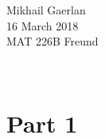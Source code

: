 \documentclass[11pt]{article}
\theoremstyle{definition}
\theoremstyle{remark}
\newcommand{\newquestion}{\hrulefill\vspace{-0.8\baselineskip}\\\null\hrulefill\vspace{-1.0\baselineskip}}
\theoremstyle{plain}
\begin{document}
  \begin{flushright}
    Mikhail Gaerlan\\
    16 March 2018\\
    MAT 226B Freund
  \end{flushright}
\vspace{-1.3\baselineskip}

\newquestion
%
%
\section*{Part 1}


\newquestion
%
%
\end{document}
